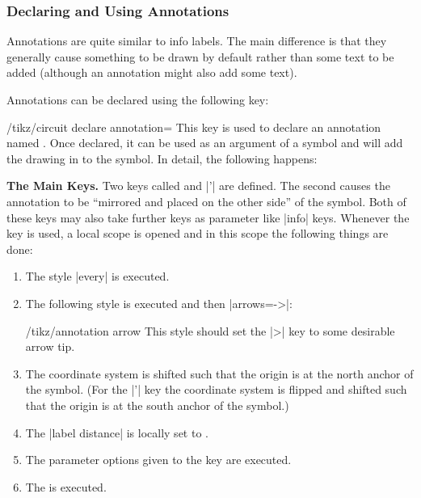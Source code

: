 \subsubsection{Declaring and Using Annotations}

Annotations are quite similar to info labels. The main difference is
that they generally cause something to be drawn by default rather than
some text to be added (although an annotation might also add some
text).

Annotations can be declared using the following key:

\begin{key}{/tikz/circuit declare annotation=}
  This key is used to declare an annotation named . Once
  declared, it can be used as an argument of a symbol and will add the
  drawing in  to the symbol. In detail, the following
  happens:

  \textbf{The Main Keys.}
  Two keys called  and |'| are
  defined. The second causes the annotation to be ``mirrored and
  placed on the other side'' of the symbol. Both of these keys may
  also take further keys as parameter like |info| keys.
  Whenever the  key is used, a local scope is opened and in
  this scope the following things are done:
  \begin{enumerate}
  \item The style |every|  is executed.
  \item The following style is executed and then |arrows=->|:
    \begin{stylekey}{/tikz/annotation arrow}
      This style should set the |>| key to some desirable arrow tip.
    \end{stylekey}
  \item The coordinate system is shifted such that the origin is at
    the north anchor of the symbol. (For the |'| key the
    coordinate system is flipped and shifted such that the origin is
    at the south anchor of the symbol.)
  \item The |label distance| is locally set to .
  \item The parameter options given to the  key are
    executed.
  \item The  is executed.
  \end{enumerate}


\end{key}
